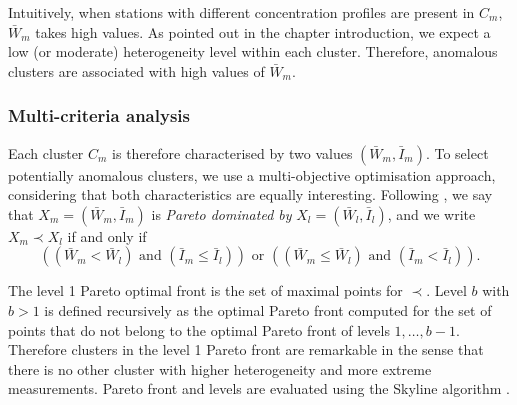 Intuitively, when stations with different concentration profiles are present in $C_m$, $\bar{W}_m$ takes high values. As pointed out in the chapter introduction, we expect a low (or moderate) heterogeneity level within each cluster. Therefore, anomalous clusters are associated with high values of $\bar{W}_m$.




\subsubsection{Multi-criteria analysis}

Each cluster $C_m$ is therefore characterised by two values $(\bar{W}_m, \bar{I}_m)$. To select potentially anomalous clusters, we use a multi-objective optimisation approach, considering that both characteristics are equally interesting. Following \cite{KIELING2002311}, we say that  $X_m = (\bar{W}_m, \bar{I}_m)$ is \emph{Pareto dominated by} $X_l = (\bar{W}_l,\bar{I}_l)$, and we write $X_m \prec X_l$ if and only if
\begin{equation*}
    \left((\bar{W}_m<\bar{W}_l)\text{ and }(\bar{I}_m\leq \bar{I}_l)\right)
    \text{ or }\left((\bar{W}_m \leq \bar{W}_l)\text{ and }(\bar{I}_m < \bar{I}_l)\right).
\end{equation*}

The level 1 Pareto optimal front is the set of maximal points for $\prec$. Level $b$ with $b>1$ is defined recursively as the optimal Pareto front computed for the set of points that do not belong to the optimal Pareto front of levels $1,\ldots,b-1$. 
Therefore clusters in the level 1 Pareto front are remarkable in the sense that there is no other cluster with higher heterogeneity and more extreme measurements. Pareto front and levels are evaluated using the Skyline algorithm \cite{914855,endres2015scalagon}. 

